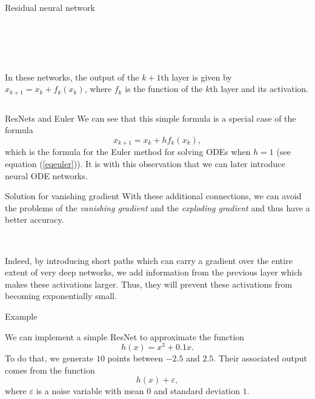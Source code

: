 \documentclass[11pt]{beamer}
\begin{document}
\begin{frame}{Residual neural network}
\begin{columns}[t]
\begin{column}{5cm}
\begin{center}
  ~
  
  ~
  
  
  In these networks, the output of the $k+1$th layer is given by
$
x_{k+1} = x_k + f_k(x_k)
$,
where $f_k$ is the function of the $k$th layer and its activation. 
  \end{center}

  \end{column}
 \end{columns} 





\end{frame}

\begin{frame}{ResNets and Euler}
We can see that this simple formula is a special case of the formula
\begin{equation*}
x_{k+1} = x_k + hf_k(x_k),
\end{equation*}
which is the formula for the Euler method for solving ODEs when $h = 1$ (see equation (\ref{eqeuler})). It is with this observation that we can later introduce neural ODE networks.

\end{frame}

\begin{frame}{Solution for vanishing gradient}
With these additional connections, we can avoid the problems of the \textit{vanishing gradient} and the \textit{exploding gradient} and thus have a better accuracy. 

~

Indeed, by introducing short paths which can carry a gradient over the entire extent of very deep networks, we add information from the previous layer which makes these activations larger. Thus, they will prevent these activations from becoming exponentially small.

\end{frame}

\begin{frame}{Example}

We can implement a simple ResNet to approximate the function
$$
h(x) = x^3 + 0.1x.
$$
To do that, we generate $10$ points between $-2.5$ and $2.5$. Their associated output comes from the function
$$
h(x) + \varepsilon,
$$
where $\varepsilon$ is a noise variable with mean $0$ and standard deviation $1$.
\end{frame}
\end{document}

